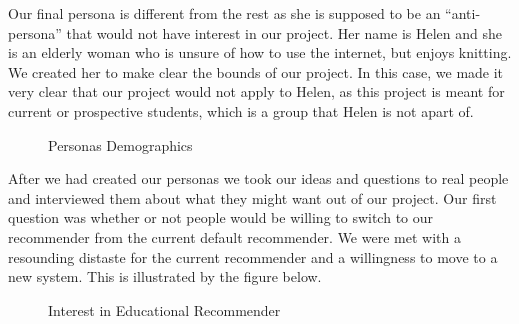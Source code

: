 \documentclass[letterpaper]{article} %
\begin{document}
Our final persona is different from the rest as she is supposed to be an “anti-persona” that would not have interest in our project. Her name is Helen and she is an elderly woman who is unsure of how to use the internet, but enjoys knitting. We created her to make clear the bounds of our project. In this case, we made it very clear that our project would not apply to Helen, as this project is meant for current or prospective students, which is a group that Helen is not apart of.

\begin{figure}
\centering
{}
\caption{Personas Demographics}
\label{fig:Demographics}
\end{figure}


After we had created our personas we took our ideas and questions to real people and interviewed them about what they might want out of our project. Our first question was whether or not people would be willing to switch to our recommender from the current default recommender. We were met with a resounding distaste for the current recommender and a willingness to move to a new system. This is illustrated by the figure below.

\begin{figure}[h]
        \center
        \caption{Interest in Educational Recommender}
        \label{fig:InterestPie}
    \end{figure}
\end{document}

